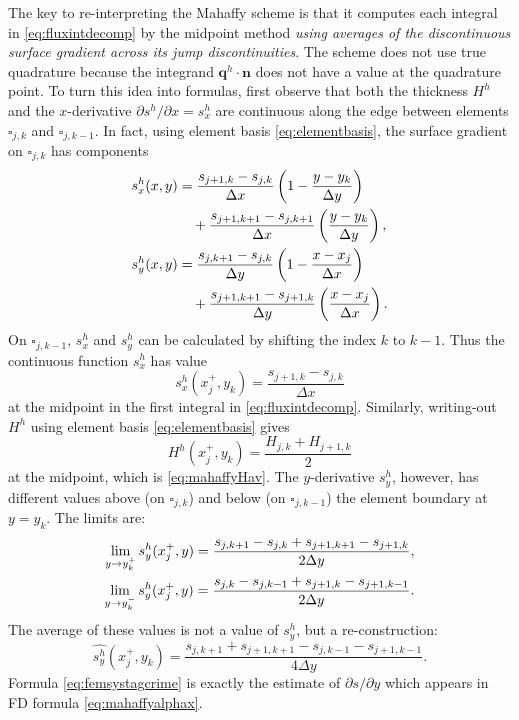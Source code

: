 \documentclass[twocolumn,letterpaper]{igs}
\newcommand\bn{\mathbf{n}}
\newcommand\bq{\mathbf{q}}
\begin{document}
The key to re-interpreting the Mahaffy scheme is that it computes each integral in \eqref{eq:fluxintdecomp} by the midpoint method \emph{using averages of the discontinuous surface gradient across its jump discontinuities}.  The scheme does not use true quadrature because the integrand $\bq^h\cdot \bn$ does not have a value at the quadrature point.  To turn this idea into formulas, first observe that both the thickness $H^h$ and the $x$-derivative $\partial s^h/\partial x = s^h_x$ are continuous along the edge between elements $\square_{j,k}$ and $\square_{j,k-1}$.  In fact, using element basis \eqref{eq:elementbasis}, the surface gradient on $\square_{j,k}$ has components
\begin{align}
s^h_x(x,y) &= \frac{s_{j+1,k}-s_{j,k}}{\Delta x} \left(1-\frac{y-y_k}{\Delta y}\right)  \label{eq:grads} \\
   &\quad + \frac{s_{j+1,k+1}-s_{j,k+1}}{\Delta x} \left(\frac{y-y_k}{\Delta y}\right), \notag \\
s^h_y(x,y) &= \frac{s_{j,k+1}-s_{j,k}}{\Delta y} \left(1-\frac{x-x_j}{\Delta x}\right) \notag \\
   &\quad + \frac{s_{j+1,k+1}-s_{j+1,k}}{\Delta y} \left(\frac{x-x_j}{\Delta x}\right). \notag
\end{align}
On $\square_{j,k-1}$, $s^h_x$ and $s^h_y$ can be calculated by shifting the index $k$ to $k-1$.  Thus the continuous function $s^h_x$ has value
\begin{equation}
s^h_x(x_j^+,y_k) = \frac{s_{j+1,k}-s_{j,k}}{\Delta x} \label{eq:femsxstag}
\end{equation}
at the midpoint in the first integral in \eqref{eq:fluxintdecomp}.  Similarly, writing-out $H^h$ using element basis \eqref{eq:elementbasis} gives
\begin{equation}
H^h(x_j^+,y_k) = \frac{H_{j,k}+H_{j+1,k}}{2} \label{eq:femHstag}
\end{equation}
at the midpoint, which is \eqref{eq:mahaffyHav}.  The $y$-derivative $s^h_y$, however, has different values above (on $\square_{j,k}$) and below (on $\square_{j,k-1}$) the element boundary at $y = y_k$.  The limits are:
\begin{align}
\lim_{y\to y_k^+} s^h_y(x_j^+,y) = \frac{s_{j,k+1}-s_{j,k} + s_{j+1,k+1}-s_{j+1,k}}{2\Delta y}, \\
\lim_{y\to y_k^-} s^h_y(x_j^+,y) = \frac{s_{j,k}-s_{j,k-1} + s_{j+1,k}-s_{j+1,k-1}}{2\Delta y}. \notag
\end{align}
The average of these values is not a value of $s_y^h$, but a re-construction:
\begin{equation}
\widehat{s^h_y}(x_j^+,y_k) = \frac{s_{j,k+1} + s_{j+1,k+1} - s_{j,k-1} - s_{j+1,k-1}}{4\Delta y}. \label{eq:femsystagcrime}
\end{equation}
Formula \eqref{eq:femsystagcrime} is exactly the estimate of $\partial s/\partial y$ which appears in FD formula \eqref{eq:mahaffyalphax}.
\end{document}
